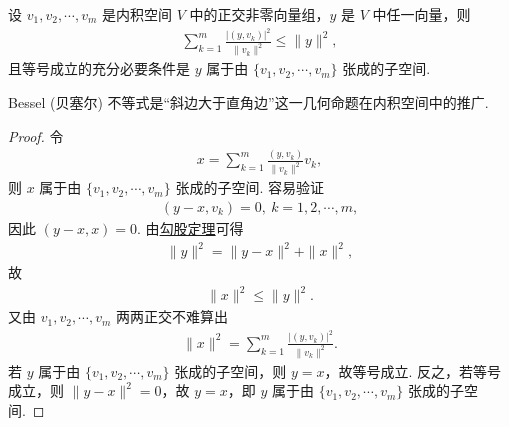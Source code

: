 \documentclass[../../main.tex]{subfiles}
\begin{document}
\begin{proposition}\label{proposition:Bessel不等式}
设 $v_1, v_2, \cdots, v_m$ 是内积空间 $V$ 中的正交非零向量组，$y$ 是 $V$ 中任一向量，则
\begin{align*}
\sum_{k = 1}^{m}\frac{|(y, v_k)|^2}{\|v_k\|^2} \leq \|y\|^2,
\end{align*}
且等号成立的充分必要条件是 $y$ 属于由 $\{v_1, v_2, \cdots, v_m\}$ 张成的子空间.
\end{proposition}
\begin{remark}
Bessel (贝塞尔) 不等式是“斜边大于直角边”这一几何命题在内积空间中的推广.
\end{remark}
\begin{proof}
令
\begin{align*}
x = \sum_{k = 1}^{m}\frac{(y, v_k)}{\|v_k\|^2}v_k,
\end{align*}
则 $x$ 属于由 $\{v_1, v_2, \cdots, v_m\}$ 张成的子空间. 容易验证
\begin{align*}
(y - x, v_k) = 0, \ k = 1, 2, \cdots, m,
\end{align*}
因此 $(y - x, x) = 0$. 由\hyperref[corollary:范数性质的相关推广-勾股定理]{勾股定理}可得
\begin{align*}
\|y\|^2 = \|y - x\|^2 + \|x\|^2,
\end{align*}
故
\begin{align*}
\|x\|^2 \leq \|y\|^2.
\end{align*}
又由 $v_1, v_2, \cdots, v_m$ 两两正交不难算出
\begin{align*}
\|x\|^2 = \sum_{k = 1}^{m}\frac{|(y, v_k)|^2}{\|v_k\|^2}.
\end{align*}
若 $y$ 属于由 $\{v_1, v_2, \cdots, v_m\}$ 张成的子空间，则 $y = x$，故等号成立. 反之，若等号成立，则 $\|y - x\|^2 = 0$，故 $y = x$，即 $y$ 属于由 $\{v_1, v_2, \cdots, v_m\}$ 张成的子空间. 
\end{proof}
\end{document}
